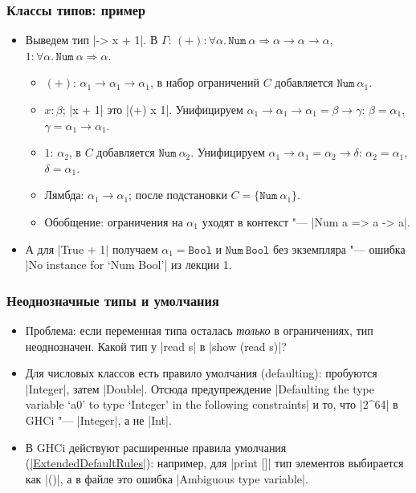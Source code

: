 \documentclass[11pt]{beamer}
\newcommand{\tBool}{\mathtt{Bool}}
\newcommand{\tNum}{\mathtt{Num}}
\begin{document}
\begin{frame}[fragile]
  \frametitle{Классы типов: пример}
  \begin{itemize}
    \item Выведем тип \haskinline|\x -> x + 1|. В $\Gamma$: $(+) : \forall\alpha.\,\tNum~\alpha \Rightarrow \alpha \to \alpha \to \alpha$, $1 : \forall\alpha.\,\tNum~\alpha \Rightarrow \alpha$.
          \pause
          \begin{itemize}
            \item $(+)$: $\alpha_1 \to \alpha_1 \to \alpha_1$, в набор ограничений $C$ добавляется $\tNum~\alpha_1$.
                  \pause
            \item $x : \beta$; \haskinline|x + 1| это \haskinline|(+) x 1|. Унифицируем $\alpha_1 \to \alpha_1 \to \alpha_1 = \beta \to \gamma$: $\beta = \alpha_1$, $\gamma = \alpha_1 \to \alpha_1$.
                  \pause
            \item $1$: $\alpha_2$, в $C$ добавляется $\tNum~\alpha_2$. Унифицируем $\alpha_1 \to \alpha_1 = \alpha_2 \to \delta$: $\alpha_2 = \alpha_1$, $\delta = \alpha_1$.
                  \pause
            \item Лямбда: $\alpha_1 \to \alpha_1$; после подстановки $C = \{\tNum~\alpha_1\}$.
                  \pause
            \item Обобщение: ограничения на $\alpha_1$ уходят в контекст "--- \haskinline|Num a => a -> a|.
          \end{itemize}
          \pause
    \item А для \haskinline|True + 1| получаем $\alpha_1 = \tBool$ и $\tNum~\tBool$ без экземпляра "--- ошибка \ghcinline|No instance for ‘Num Bool’| из лекции 1.
  \end{itemize}
\end{frame}

\begin{frame}[fragile]
  \frametitle{Неоднозначные типы и умолчания}
  \begin{itemize}
    \item Проблема: если переменная типа осталась \emph{только} в ограничениях, тип неоднозначен. Какой тип у \haskinline|read s| в \haskinline|show (read s)|?
          \pause
    \item Для числовых классов есть правило умолчания (defaulting): пробуются \haskinline|Integer|, затем \haskinline|Double|. Отсюда предупреждение \ghcinline|Defaulting the type variable ‘a0’ to type ‘Integer’ in the following constraints| и то, что \haskinline|2^64| в GHCi "--- \haskinline|Integer|, а не \haskinline|Int|.
          \pause
    \item В GHCi действуют расширенные правила умолчания (\href{https://downloads.haskell.org/~ghc/latest/docs/users_guide/ghci.html#extension-ExtendedDefaultRules}{\haskinline|ExtendedDefaultRules|}): например, для \haskinline|print []| тип элементов выбирается как \haskinline|()|, а в файле это ошибка \ghcinline|Ambiguous type variable|.
  \end{itemize}
\end{frame}
\end{document}

